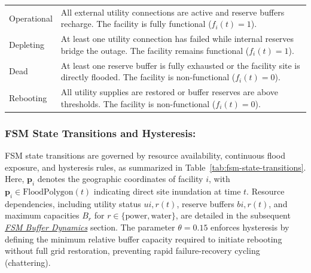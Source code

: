 \vspace{7mm}

\noindent
\begin{tabularx}{\textwidth}{@{}l X@{}}
    Operational & All external utility connections are active and reserve buffers recharge.
    The facility is fully functional ($f_i(t) = 1$). \\
    Depleting & At least one utility connection has failed while internal reserves bridge the outage.
    The facility remains functional ($f_i(t) = 1$). \\
    Dead & At least one reserve buffer is fully exhausted or the facility site is directly flooded.
    The facility is non-functional ($f_i(t) = 0$). \\
    Rebooting & All utility supplies are restored or buffer reserves are above thresholds.
    The facility is non-functional ($f_i(t) = 0$).
\end{tabularx}

\subsubsection{FSM State Transitions and Hysteresis:}
FSM state transitions are governed by resource availability, continuous flood exposure, and hysteresis rules, as summarized in Table~\ref{tab:fsm-state-transitions}.
Here, $\mathbf{p}_i$ denotes the geographic coordinates of facility $i$, with $\mathbf{p}_i \in \text{FloodPolygon}(t)$ indicating direct site inundation at time $t$.
Resource dependencies, including utility status $u{i,r}(t)$, reserve buffers $b{i,r}(t)$, and maximum capacities $B_r$ for $r \in \{\text{power}, \text{water}\}$, are detailed in the subsequent \hyperref[subsubsec:fsm-buffer-dynamics]{\textit{FSM Buffer Dynamics}} section.
The parameter $\theta = 0.15$ enforces hysteresis by defining the minimum relative buffer capacity required to initiate rebooting without full grid restoration, preventing rapid failure-recovery cycling (chattering).

\vspace{-\topsep}

